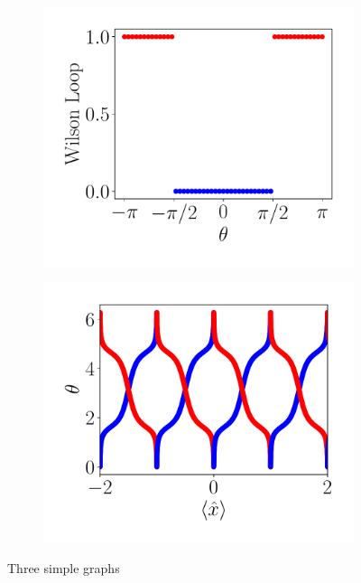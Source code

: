 \begin{figure}[h!]
\begin{subfigure}[b!]{0.27 \textwidth}
         \label{}
     \end{subfigure}\hspace*{-0.9em}
     \begin{subfigure}[b!]{0.27 \textwidth}
         \caption{}
         \includegraphics[width=\textwidth]{Imagenes/Shh_images/winding_shh_pump.pdf}
         \label{}
     \end{subfigure}\hspace*{-0.9em}
     \begin{subfigure}[b!]{0.27 \textwidth}
         \caption{}
         \includegraphics[width=\textwidth]{Imagenes/Shh_images/wannier_center_shh_pump.pdf}
         \label{}
     \end{subfigure}
        \caption{Three simple graphs}
        \label{fig:three graphs}
\end{figure}

